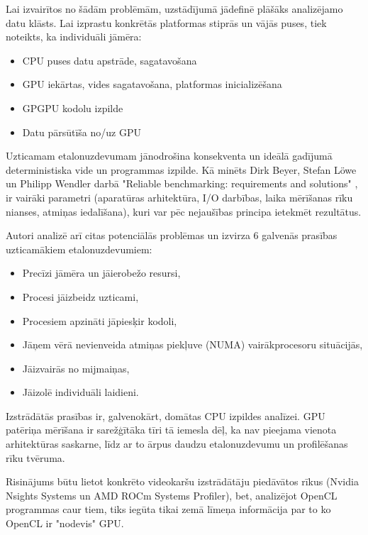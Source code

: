 Lai izvairītos no šādām problēmām, uzstādījumā jādefinē plāšāks
analizējamo datu klāsts. Lai izprastu konkrētās platformas stiprās un vājās
puses, tiek noteikts, ka individuāli jāmēra:
\begin{itemize}
    \item CPU puses datu apstrāde, sagatavošana
    \item GPU iekārtas, vides sagatavošana, platformas inicializēšana
    \item GPGPU kodolu izpilde
    \item Datu pārsūtīša no/uz GPU
\end{itemize}

Uzticamam etalonuzdevumam jānodrošina konsekventa un ideālā gadījumā
deterministiska vide un programmas izpilde. Kā minēts Dirk Beyer, Stefan Löwe
un Philipp Wendler darbā "Reliable benchmarking: requirements and solutions"
\cite{reliable-benchmarking}, ir vairāki parametri (aparatūras arhitektūra, I/O
darbības, laika mērīšanas rīku nianses, atmiņas iedalīšana), kuri var pēc
nejaušības principa ietekmēt rezultātus.

Autori analizē arī citas potenciālās problēmas un izvirza 6 galvenās prasības
uzticamākiem etalonuzdevumiem: \cite{reliable-benchmarking}
\begin{itemize}
    \item Precīzi jāmēra un jāierobežo resursi,
    \item Procesi jāizbeidz uzticami,
    \item Procesiem apzināti jāpiesķir kodoli,
    \item Jāņem vērā nevienveida atmiņas piekļuve (NUMA) vairākprocesoru
        situācijās,
    \item Jāizvairās no mijmaiņas,
    \item Jāizolē individuāli laidieni.
\end{itemize}

Izstrādātās prasības ir, galvenokārt, domātas CPU izpildes analīzei. GPU
patēriņa mērīšana ir sarežģītāka tīri tā iemesla dēļ, ka nav pieejama vienota
arhitektūras saskarne, līdz ar to ārpus daudzu etalonuzdevumu un profilēšanas
rīku tvēruma. \cite{reliable-benchmarking}

Risinājums būtu lietot konkrēto videokaršu izstrādātāju piedāvātos rīkus 
(Nvidia Nsights\cite{nvidia-nsights} Systems un AMD ROCm Systems
Profiler\cite{rocm-profiler}), bet, analizējot OpenCL programmas caur tiem,
tiks iegūta tikai zemā līmeņa informācija par to ko OpenCL ir "nodevis" GPU.

